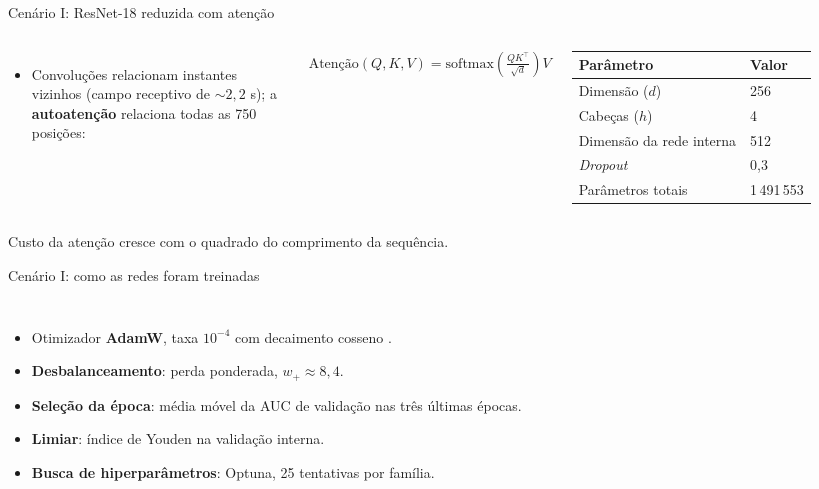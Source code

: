 \documentclass[10pt,aspectratio=169]{beamer}
\newcommand{\fonte}[1]{\par\vfill{\scriptsize\color{cinza}#1}}
\newcommand{\caixacinza}[1]{\begin{center}\colorbox{black!7}{\parbox{0.9\linewidth}{\centering #1}}\end{center}}
\newcommand{\equacao}[1]{\caixacinza{$\displaystyle #1$}}
\begin{document}
\begin{frame}{Cenário I: ResNet-18 reduzida com atenção}
  \small
  \begin{columns}[T]
    \begin{itemize}
      \item Convoluções relacionam instantes vizinhos (campo receptivo de ${\sim}2{,}2$ s); a \textbf{autoatenção} \cite{vaswani2017attention} relaciona todas as 750 posições:
    \end{itemize}
    \equacao{\mathrm{Atenção}(Q,K,V)=\mathrm{softmax}\!\left(\tfrac{QK^{\top}}{\sqrt{d}}\right)V}
    \footnotesize
    \begin{tabular}{ll}
      \toprule
      Parâmetro & Valor \\
      \midrule
      Dimensão ($d$) & 256 \\
      Cabeças ($h$) & 4 \\
      Dimensão da rede interna & 512 \\
      \textit{Dropout} & 0,3 \\
      Parâmetros totais & 1\,491\,553 \\
      \bottomrule
    \end{tabular}
  \end{columns}
  \fonte{Custo da atenção cresce com o quadrado do comprimento da sequência.}
\end{frame}


\begin{frame}{Cenário I: como as redes foram treinadas}
  \begin{columns}[T]
    \small
    \begin{itemize}
      \item Otimizador \textbf{AdamW}, taxa $10^{-4}$ com decaimento cosseno
        \cite{loshchilov2017sgdr}.
      \item \textbf{Desbalanceamento}: perda ponderada, $w_{+} \approx 8{,}4$.
      \item \textbf{Seleção da época}: média móvel da AUC de validação nas
        três últimas épocas.
      \item \textbf{Limiar}: índice de Youden na validação interna.
      \item \textbf{Busca de hiperparâmetros}: Optuna, 25 tentativas por família.
    \end{itemize}
    \centering
  \end{columns}
\end{frame}
\end{document}
